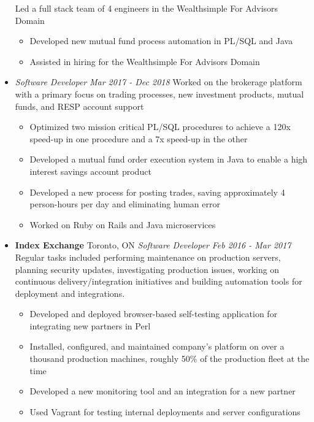 \documentclass[letterpaper,11pt]{article}
\newcommand{\resumeSubHeading}[4]{
	\item[]
      \textbf{#1} \hfill #2 \newline
      \textit{#3} \hfill \textit{#4}
}
\newcommand{\jobAtSamePlace}[2]{
	\item[]
      \textit{#1} \hfill \textit{#2}
}
\begin{document}
\begin{itemize}[leftmargin=*]
	  Led a full stack team of 4 engineers in the Wealthsimple For Advisors Domain
      \begin{itemize}[noitemsep,topsep=0pt]
      	\item Developed new mutual fund process automation in PL/SQL and Java
      	\item Assisted in hiring for the Wealthsimple For Advisors Domain
      \end{itemize}
      \jobAtSamePlace
      {Software Developer}{Mar 2017 - Dec 2018}\newline
      Worked on the brokerage platform with a primary focus on trading processes, new investment products, mutual funds, and RESP account support
      \begin{itemize}[noitemsep,topsep=0pt]
      	\item Optimized two mission critical PL/SQL procedures to achieve a 120x speed-up in one procedure and a 7x speed-up in the other
      	\item Developed a mutual fund order execution system in Java to enable a high interest savings account product
      	\item Developed a new process for posting trades, saving approximately 4 person-hours per day and eliminating human error
        \item Worked on Ruby on Rails and Java microservices
      \end{itemize}

  \newpage

	\resumeSubHeading
      {Index Exchange}{Toronto, ON}
      {Software Developer}{Feb 2016 - Mar 2017}\newline
      Regular tasks included performing maintenance on production servers, planning security updates, investigating production issues, working on continuous delivery/integration initiatives and building automation tools for deployment and integrations.
      \begin{itemize}[noitemsep,topsep=0pt]
        \item Developed and deployed browser-based self-testing application for integrating new partners in Perl
        \item Installed, configured, and maintained company's platform on over a thousand production machines, roughly 50\% of the production fleet at the time
        \item Developed a new monitoring tool and an integration for a new partner
        \item Used Vagrant for testing internal deployments and server configurations
      \end{itemize}    
\end{itemize}
\end{document}
